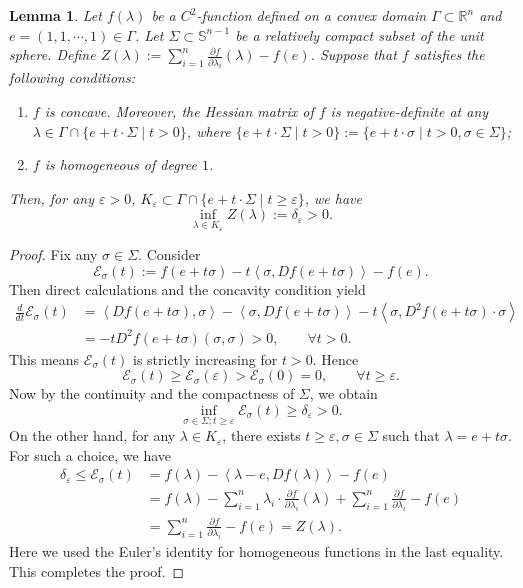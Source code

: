 \documentclass[10pt,a4paper]{amsart}
\newtheorem{lemma}[theorem]{Lemma}
\newcommand{\R}{\ensuremath{\mathbb{R}}}
\newcommand{\pd}[2]{\frac{\partial {#1}}{\partial {#2}}}
\newcommand{\ip}[2]{\ensuremath{\left< {#1}, {#2} \right>}}
\newcommand{\eps}{\ensuremath{\varepsilon}}
\numberwithin{equation}{section}
\begin{document}
\begin{lemma}\label{lem:algebraic}
    Let \(f(\lambda)\) be a \(C^2\)-function defined on a convex domain \(\Gamma \subset \R^n\) and \(e = (1,1,\cdots,1) \in \Gamma\). Let \(\Sigma \subset \mathbb{S}^{n-1}\) be a relatively compact subset of the unit sphere. Define \(Z(\lambda) := \sum_{i=1}^{n}\pd{f}{\lambda_i}(\lambda) - f(e)\). Suppose that \(f\) satisfies the following conditions: 
    \begin{enumerate}
        \item \(f\) is concave. Moreover, the Hessian matrix of \(f\) is negative-definite at any \(\lambda\in \Gamma\cap\{ e+t\cdot\Sigma \mid t > 0\}\), where \(\{ e+t\cdot\Sigma \mid t > 0\} := \{ e+t\cdot\sigma \mid t > 0, \sigma\in \Sigma\}\); 
        \item \(f\) is homogeneous of degree \(1\).
    \end{enumerate}
    Then, for any \(\eps > 0\), \(K_{\eps} \subset \Gamma\cap\{ e+t\cdot\Sigma \mid t\geq \eps\}\), we have 
    \[ \inf_{\lambda \in K_{\eps}}Z(\lambda) := \delta_{\eps} > 0. \]
\end{lemma}
\begin{proof}
    Fix any \(\sigma\in \Sigma\). Consider 
    \[ \mathcal{E}_{\sigma}(t) := f(e+t\sigma) - t\ip{\sigma}{D f(e+t\sigma)} - f(e). \]
    Then direct calculations and the concavity condition yield
    \[ \begin{aligned}
        \frac{d}{dt}\mathcal{E}_{\sigma}(t) &= \ip{D f(e+t\sigma)}{\sigma} - \ip{\sigma}{Df(e+t\sigma)} - t\ip{\sigma}{D^2 f(e+t\sigma)\cdot \sigma} \\
        &= -t D^2 f(e+t\sigma)(\sigma,\sigma) > 0,\qquad \forall t>0.
    \end{aligned} \]
    This means \(\mathcal{E}_{\sigma}(t)\) is strictly increasing for \(t > 0\). Hence 
    \[ \mathcal{E}_{\sigma}(t) \geq \mathcal{E}_{\sigma}(\eps) > \mathcal{E}_{\sigma}(0) = 0,\qquad \forall t\geq \eps. \] 
    Now by the continuity and the compactness of \(\Sigma\), we obtain 
    \[ \inf_{\sigma\in \Sigma; t\geq \eps} \mathcal{E}_{\sigma}(t) \geq \delta_{\eps} > 0. \]
    On the other hand, for any \(\lambda\in K_{\eps}\), there exists \(t\geq \eps, \sigma\in \Sigma\) such that \(\lambda = e+t\sigma\). For such a choice, we have 
    \[ \begin{aligned}
        \delta_{\eps} \leq \mathcal{E}_{\sigma}(t) &= f(\lambda) - \ip{\lambda - e}{Df(\lambda)} - f(e) \\
        &= f(\lambda) - \sum_{i=1}^{n}\lambda_i\cdot \pd{f}{\lambda_i}(\lambda) + \sum_{i=1}^{n}\pd{f}{\lambda_i} - f(e) \\
        &= \sum_{i=1}^{n}\pd{f}{\lambda_i} - f(e) = Z(\lambda).
    \end{aligned}  \]
    Here we used the Euler's identity for homogeneous functions in the last equality. This completes the proof.
\end{proof}
\end{document}
